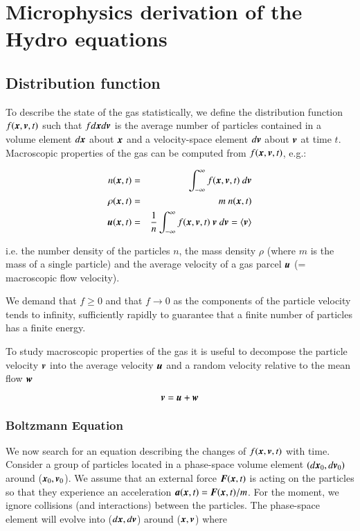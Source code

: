 
\chapter{Microphysics derivation of the Hydro equations}

\section{Distribution function}

To describe the state of the gas statistically, we define the distribution function $f ({\boldsymbol{x}}, {\boldsymbol{v}}, t)$ such that $f d{\boldsymbol{x}} d{\boldsymbol{v}}$ is the average number of particles contained in a volume element $d{\boldsymbol{x}}$ about ${\boldsymbol{x}}$ and a velocity-space element $d{\boldsymbol{v}}$ about ${\boldsymbol{v}}$ at time $t$. Macroscopic properties of the gas can be computed from $f ({\boldsymbol{x}}, {\boldsymbol{v}}, t)$, e.g.:

\begin{eqnarray}
n(\v{x}, t) &=& \int_{-\infty}^\infty f (\v{x}, \v{v}, t) \ d\v{v} \\
\rho(\v{x}, t) &=& m \ n(\v{x}, t)\\
\v{u}(\v{x}, t) &=& \frac{1}{n}\int_{-\infty}^\infty f (\v{x}, \v{v}, t) \ \v{v} \ d\v{v} = \langle \v{v} \rangle 
\end{eqnarray}


\noindent i.e. the number density of the particles $n$, the mass density $\rho$ (where $m$ is the mass of a single particle) and the average velocity of a gas parcel ${\boldsymbol{u}}$ (= macroscopic flow velocity). 

\noindent We demand that $f \geq 0$ and that $f \rightarrow 0$ as the components of the particle velocity tends to infinity, sufficiently rapidly to guarantee that a finite number of particles has a finite energy.

\noindent To study macroscopic properties of the gas it is useful to decompose the particle velocity ${\boldsymbol{v}}$ into the average velocity ${\boldsymbol{u}}$ and a random velocity relative to the mean flow ${\boldsymbol{w}}$


\begin{equation}
{\boldsymbol{v}} = {\boldsymbol{u}} + {\boldsymbol{w}}
\end{equation}

\subsection{Boltzmann Equation}

We now search for an equation describing the changes of $f ({\boldsymbol{x}}, {\boldsymbol{v}}, t)$ with time. Consider a group of particles located in a phase-space volume element $(d{\boldsymbol{x}}_0, d{\boldsymbol{v}}_0)$ around (${\boldsymbol{x}}_0, {\boldsymbol{v}}_0$). We assume that an external force ${\boldsymbol{F}}({\boldsymbol{x}}, t)$ is acting on the particles so that they experience an acceleration ${\boldsymbol{a}}({\boldsymbol{x}}, t) = {\boldsymbol{F}}({\boldsymbol{x}}, t)/m$. For the moment, we ignore collisions (and interactions) between the particles. The phase-space element will evolve into ($d{\boldsymbol{x}},d{\boldsymbol{v}}$) around (${\boldsymbol{x}},{\boldsymbol{v}}$) where

